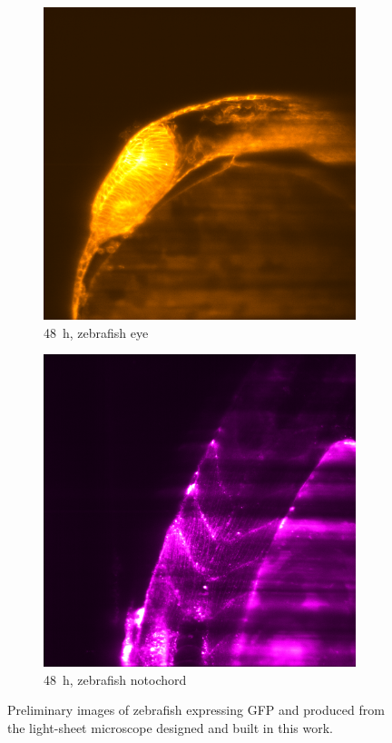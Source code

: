 \begin{figure}
  \centering
  \begin{subfigure}[t]{0.4\linewidth}
    \centering
    \includegraphics[width=0.9\linewidth]{zfish_48hr_eye_magneta}
    \caption{\SI{48}{\hour}, \gls{zebrafish} eye}
  \end{subfigure}\quad
  \begin{subfigure}[t]{0.4\linewidth}
    \centering
    \includegraphics[width=0.9\linewidth]{zfish_48hr_noto_magenta}
    \caption{\SI{48}{\hour}, \gls{zebrafish} notochord}
  \end{subfigure}
  \caption[Preliminary images of zebrafish]{Preliminary images of zebrafish expressing \gls{GFP} and produced from the light-sheet microscope designed and built in this work.}\label{fig:zfish_pretty}
\end{figure}

